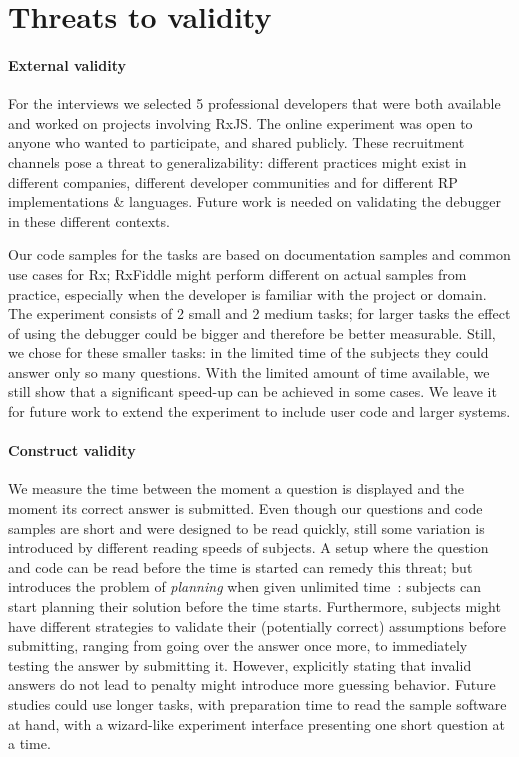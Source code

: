 \section{Threats to validity}
\paragraph{External validity} For the interviews we selected 5
professional developers that were both available and worked on projects
involving RxJS.  The online experiment was open to anyone who wanted to
participate, and shared publicly.  These recruitment channels pose a
threat to generalizability:  different practices might exist in
different companies, different developer communities and for different
RP implementations \& languages.  Future work is needed on validating
the debugger in these different contexts.

Our code samples for the tasks are based on documentation samples and
common use cases for Rx; RxFiddle might perform different on actual
samples from practice, especially when the developer is familiar with
the project or domain.  The experiment consists of 2 small and 2 medium
tasks; for larger tasks the effect of using the debugger could be bigger
and therefore be better measurable.  Still, we chose for these smaller
tasks:  in the limited time of the subjects they could answer only so
many questions.  With the limited amount of time available, we still
show that a significant speed-up can be achieved in some cases.  We
leave it for future work to extend the experiment to include user code
and larger systems.

\paragraph{Construct validity} We measure the time between the moment a
question is displayed and the moment its correct answer is submitted.
Even though our questions and code samples are short and were designed
to be read quickly, still some variation is introduced by different
reading speeds of subjects.  A setup where the question and code can be
read before the time is started can remedy this threat; but introduces
the problem of \emph{planning} when given unlimited time~\cite{ko2015practical}:
subjects can start planning their solution before the time starts.
Furthermore, subjects might have different strategies to validate their
(potentially correct) assumptions before submitting, ranging from going
over the answer once more, to immediately testing the answer by
submitting it.  However, explicitly stating that invalid answers do not
lead to penalty might introduce more guessing behavior.  Future studies
could use longer tasks, with preparation time to read the sample
software at hand, with a wizard-like experiment interface presenting one
short question at a time.

